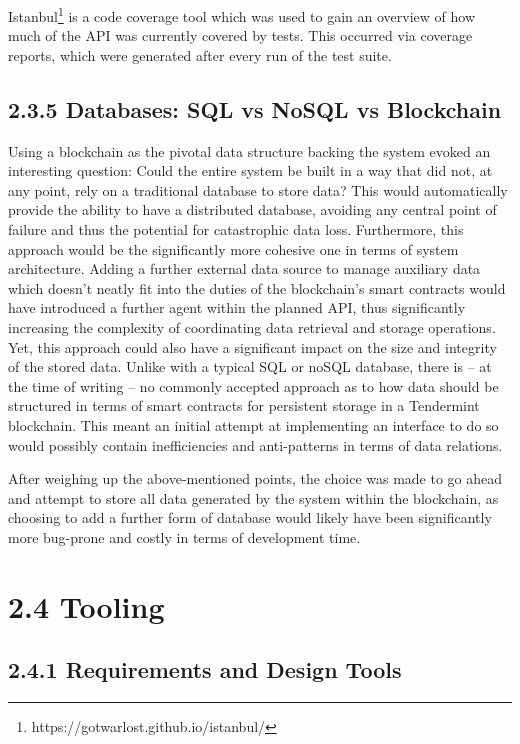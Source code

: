 \documentclass[12pt]{report}
\begin{document}
Istanbul\footnote{https://gotwarlost.github.io/istanbul/} is a
code coverage tool which was used to gain an overview of how much of the
API was currently covered by tests. This occurred via coverage reports,
which were generated after every run of the test suite.

\subsection{2.3.5 Databases: SQL vs NoSQL vs
Blockchain}\label{databases-sql-vs-nosql-vs-blockchain}

Using a blockchain as the pivotal data structure backing the system
evoked an interesting question: Could the entire system be built in a
way that did not, at any point, rely on a traditional database to store
data? This would automatically provide the ability to have a distributed
database, avoiding any central point of failure and thus the potential
for catastrophic data loss. Furthermore, this approach would be the
significantly more cohesive one in terms of system architecture. Adding
a further external data source to manage auxiliary data which doesn't
neatly fit into the duties of the blockchain's smart contracts would
have introduced a further agent within the planned API, thus
significantly increasing the complexity of coordinating data retrieval
and storage operations.\\
Yet, this approach could also have a significant impact on the size and
integrity of the stored data. Unlike with a typical SQL or noSQL
database, there is -- at the time of writing -- no commonly accepted
approach as to how data should be structured in terms of smart contracts
for persistent storage in a Tendermint blockchain. This meant an initial
attempt at implementing an interface to do so would possibly contain
inefficiencies and anti-patterns in terms of data relations.

After weighing up the above-mentioned points, the choice was made to go
ahead and attempt to store all data generated by the system within the
blockchain, as choosing to add a further form of database would likely
have been significantly more bug-prone and costly in terms of
development time.

\section{2.4 Tooling}\label{tooling}

\subsection{2.4.1 Requirements and Design
Tools}\label{requirements-and-design-tools}
\end{document}
